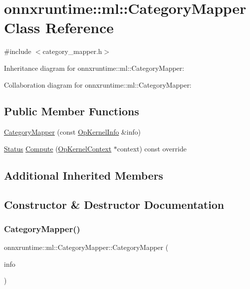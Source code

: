 \hypertarget{classonnxruntime_1_1ml_1_1CategoryMapper}{}\section{onnxruntime\+:\+:ml\+:\+:Category\+Mapper Class Reference}
\label{classonnxruntime_1_1ml_1_1CategoryMapper}


{\ttfamily \#include $<$category\+\_\+mapper.\+h$>$}



Inheritance diagram for onnxruntime\+:\+:ml\+:\+:Category\+Mapper\+:


Collaboration diagram for onnxruntime\+:\+:ml\+:\+:Category\+Mapper\+:
\subsection*{Public Member Functions}
\begin{DoxyCompactItemize}
\item 
\mbox{\hyperlink{classonnxruntime_1_1ml_1_1CategoryMapper_ab5019c0aab81a78b6b4b28235228fc25}{Category\+Mapper}} (const \mbox{\hyperlink{classonnxruntime_1_1OpKernelInfo}{Op\+Kernel\+Info}} \&info)
\item 
\mbox{\hyperlink{classonnxruntime_1_1common_1_1Status}{Status}} \mbox{\hyperlink{classonnxruntime_1_1ml_1_1CategoryMapper_af6a6cf9bb4b55b1ab3d7484f2e514f21}{Compute}} (\mbox{\hyperlink{classonnxruntime_1_1OpKernelContext}{Op\+Kernel\+Context}} $\ast$context) const override
\end{DoxyCompactItemize}
\subsection*{Additional Inherited Members}


\subsection{Constructor \& Destructor Documentation}
\mbox{\label{classonnxruntime_1_1ml_1_1CategoryMapper_ab5019c0aab81a78b6b4b28235228fc25}} 
\subsubsection{\texorpdfstring{Category\+Mapper()}{CategoryMapper()}}
{\footnotesize\ttfamily onnxruntime\+::ml\+::\+Category\+Mapper\+::\+Category\+Mapper (\begin{DoxyParamCaption}\item[{const \mbox{\hyperlink{classonnxruntime_1_1OpKernelInfo}{Op\+Kernel\+Info}} \&}]{info }\end{DoxyParamCaption})\hspace{0.3cm}{\ttfamily [inline]}}



